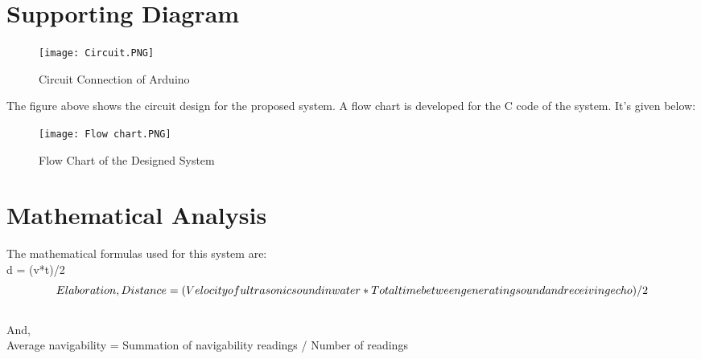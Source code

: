 \documentclass[12pt, top = 1 inch, bottom = 1 inch, left = 1.2 inch, top = .8 inch]{book}
\begin{document}
			\section{Supporting Diagram}
			\begin{figure}[h!]	
				\centering
				\texttt{[image: Circuit.PNG]}
				\caption{Circuit Connection of Arduino}
			\end{figure}
			The figure above shows the circuit design for the proposed system.
			A flow chart is developed for the C code of the system. It's given below:
			\begin{figure}[h!]	
				\centering
				\texttt{[image: Flow chart.PNG]}
				\caption{Flow Chart of the Designed System}
			\end{figure}
			\section{Mathematical Analysis}
			The mathematical formulas used for this system are:\\
			d = (v*t)/2\\
			\[Elaboration,\\
			Distance = (Velocity of ultrasonic sound in water *  Total time between generating sound and receiving echo)/2\\\] \\
			And,\\
			Average navigability = Summation of navigability readings / Number of readings\\
\end{document}
